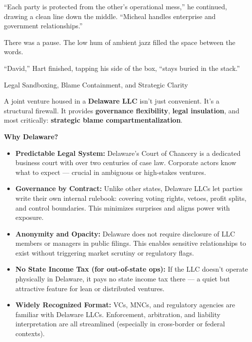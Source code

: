 \medskip

``Each party is protected from the other’s operational mess,'' he continued, drawing a clean line down the 
middle. ``Micheal handles enterprise and government relationships.''

There was a pause. The low hum of ambient jazz filled the space between the words.

``David,'' Hart finished, tapping his side of the box, ``stays buried in the stack.''

\medskip

\begin{TechnicalSidebar}{Legal Sandboxing, Blame Containment, and Strategic Clarity}

  A joint venture housed in a \textbf{Delaware LLC} isn’t just convenient. It’s a structural firewall.  
  It provides \textbf{governance flexibility}, \textbf{legal insulation}, and most critically: \textbf{strategic blame 
  compartmentalization}.
  
  \medskip
  
  \textbf{Why Delaware?}

  \medskip
  
  \begin{itemize}
    \item \textbf{Predictable Legal System:}  
    Delaware’s Court of Chancery is a dedicated business court with over two centuries of case law. Corporate actors 
    know what to expect — crucial in ambiguous or high-stakes ventures.
  
    \item \textbf{Governance by Contract:}  
    Unlike other states, Delaware LLCs let parties write their own internal rulebook: covering voting rights, vetoes, 
    profit splits, and control boundaries. This minimizes surprises and aligns power with exposure.
  
    \item \textbf{Anonymity and Opacity:}  
    Delaware does not require disclosure of LLC members or managers in public filings. This enables sensitive relationships 
    to exist without triggering market scrutiny or regulatory flags.
  
    \item \textbf{No State Income Tax (for out-of-state ops):}  
    If the LLC doesn’t operate physically in Delaware, it pays no state income tax there — a quiet but attractive feature 
    for lean or distributed ventures.
  
    \item \textbf{Widely Recognized Format:}  
    VCs, MNCs, and regulatory agencies are familiar with Delaware LLCs. Enforcement, arbitration, and liability 
    interpretation are all streamlined (especially in cross-border or federal contexts).
  \end{itemize}
  

\end{TechnicalSidebar}
